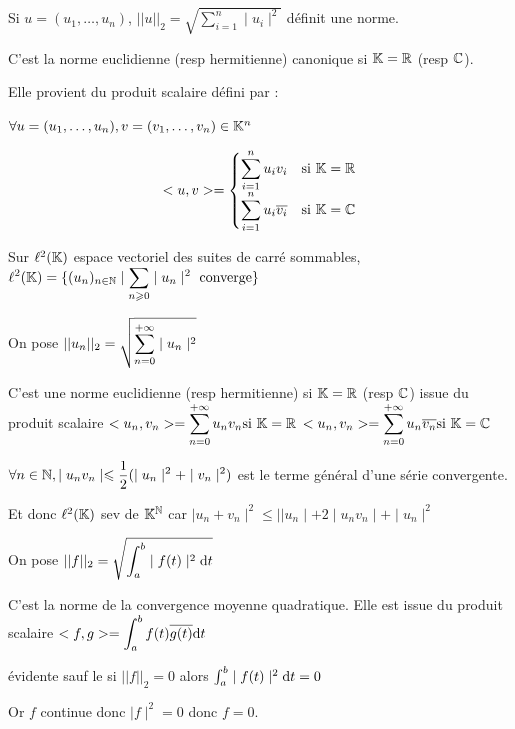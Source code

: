 \begin{exemple}
    Si $u = (u_1, \dots, u_n)$, $\displaystyle ||u||_2 = \sqrt{\sum_{i = 1}^{n} \mid u_i \mid^2}$
    définit une norme. 

    C'est la norme euclidienne (resp hermitienne) canonique si $\mathbb{K} = \mathbb{R}$ (resp $\mathbb{C}$). 

    Elle provient du produit scalaire défini par : 

    $\forall u = (u_1, \dots, u_n), v = (v_1, \dots, v_n) \in \mathbb{K}^n$

    $$
    <u, v> = \begin{cases}
        \displaystyle \sum_{i = 1}^{n} u_i v_i & \text{si } \mathbb{K} = \mathbb{R} \\
        \displaystyle \sum_{i = 1}^{n} u_i \overline{v_i} & \text{si } \mathbb{K} = \mathbb{C} \\
    \end{cases}
    $$

    Sur $\ell^2(\mathbb{K})$ espace vectoriel des suites de carré sommables,
    $\displaystyle \ell^2(\mathbb{K}) = \{(u_n)_{n \in \mathbb{N}} \mid \sum_{n \geqslant 0} \mid u_n \mid^2 \text{ converge}\}$
    
    On pose $\displaystyle ||u_n||_2 = \sqrt{\sum_{n = 0 }^{+ \infty} \mid u_n \mid^2}$

    C'est une norme euclidienne (resp hermitienne) si $\mathbb{K} = \mathbb{R}$ (resp $\mathbb{C}$) issue
    du produit scalaire $\displaystyle <u_n, v_n> = \sum_{n = 0}^{+ \infty} u_n v_n \text{si } \mathbb{K} = \mathbb{R}$
    $\displaystyle <u_n, v_n> = \sum_{n = 0}^{+ \infty} u_n \overline{v_n} \text{si } \mathbb{K} = \mathbb{C}$


    \svspace $\displaystyle \forall n \in \mathbb{N}, \mid u_n v_n \mid \leqslant \frac 1 2 (\mid u_n \mid^2 + \mid v_n \mid^2)$ est le terme
    général d'une série convergente. 

    Et donc $\ell^2(\mathbb{K})$ sev de $\mathbb{K}^{\mathbb{N}}$ car $\mid u_n + v_n \mid^2 \leqslant |\mid u_n \mid + 2 \mid u_n v_n \mid + \mid u_n \mid^2$


    \avspace On pose $\displaystyle ||f||_2 = \sqrt{\int_{a}^{b} \mid f(t) \mid^2 \text d t}$

    C'est la norme de la convergence moyenne quadratique. Elle est issue du produit scalaire
    $\displaystyle <f, g> = \int_{a}^{b} f(t) \overline{g(t)} \text d t$


    \svspace évidente sauf le si $||f||_2 = 0$ alors $\int_{a }^{b } \mid f(t) \mid^2 \text d t = 0$

    Or $f$ continue donc $\mid f \mid ^2 = 0 $ donc $f = 0$.
\end{exemple}


